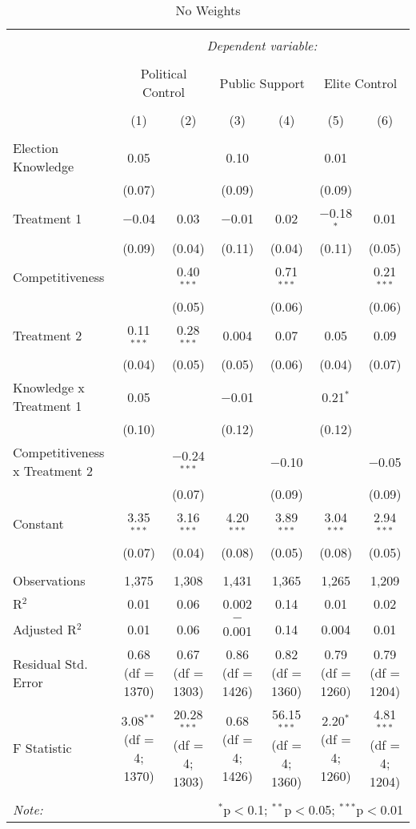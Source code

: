 
\begin{table}[!htbp] \centering 
  \caption{No Weights} 
  \label{} 
\small 
\begin{tabular}{@{\extracolsep{3pt}}lcccccc} 
\\[-1.8ex]\hline 
\hline \\[-1.8ex] 
 & \multicolumn{6}{c}{\textit{Dependent variable:}} \\ 
\cline{2-7} 
\\[-1.8ex] & \multicolumn{2}{c}{Political Control} & \multicolumn{2}{c}{Public Support} & \multicolumn{2}{c}{Elite Control} \\ 
\\[-1.8ex] & (1) & (2) & (3) & (4) & (5) & (6)\\ 
\hline \\[-1.8ex] 
 Election Knowledge & 0.05 &  & 0.10 &  & 0.01 &  \\ 
  & (0.07) &  & (0.09) &  & (0.09) &  \\ 
  Treatment 1 & $-$0.04 & 0.03 & $-$0.01 & 0.02 & $-$0.18$^{*}$ & 0.01 \\ 
  & (0.09) & (0.04) & (0.11) & (0.04) & (0.11) & (0.05) \\ 
  Competitiveness &  & 0.40$^{***}$ &  & 0.71$^{***}$ &  & 0.21$^{***}$ \\ 
  &  & (0.05) &  & (0.06) &  & (0.06) \\ 
  Treatment 2 & 0.11$^{***}$ & 0.28$^{***}$ & 0.004 & 0.07 & 0.05 & 0.09 \\ 
  & (0.04) & (0.05) & (0.05) & (0.06) & (0.04) & (0.07) \\ 
  Knowledge x Treatment 1 & 0.05 &  & $-$0.01 &  & 0.21$^{*}$ &  \\ 
  & (0.10) &  & (0.12) &  & (0.12) &  \\ 
  Competitiveness x Treatment 2 &  & $-$0.24$^{***}$ &  & $-$0.10 &  & $-$0.05 \\ 
  &  & (0.07) &  & (0.09) &  & (0.09) \\ 
  Constant & 3.35$^{***}$ & 3.16$^{***}$ & 4.20$^{***}$ & 3.89$^{***}$ & 3.04$^{***}$ & 2.94$^{***}$ \\ 
  & (0.07) & (0.04) & (0.08) & (0.05) & (0.08) & (0.05) \\ 
 \hline \\[-1.8ex] 
Observations & 1,375 & 1,308 & 1,431 & 1,365 & 1,265 & 1,209 \\ 
R$^{2}$ & 0.01 & 0.06 & 0.002 & 0.14 & 0.01 & 0.02 \\ 
Adjusted R$^{2}$ & 0.01 & 0.06 & $-$0.001 & 0.14 & 0.004 & 0.01 \\ 
Residual Std. Error & 0.68 (df = 1370) & 0.67 (df = 1303) & 0.86 (df = 1426) & 0.82 (df = 1360) & 0.79 (df = 1260) & 0.79 (df = 1204) \\ 
F Statistic & 3.08$^{**}$ (df = 4; 1370) & 20.28$^{***}$ (df = 4; 1303) & 0.68 (df = 4; 1426) & 56.15$^{***}$ (df = 4; 1360) & 2.20$^{*}$ (df = 4; 1260) & 4.81$^{***}$ (df = 4; 1204) \\ 
\hline 
\hline \\[-1.8ex] 
\textit{Note:}  & \multicolumn{6}{r}{$^{*}$p$<$0.1; $^{**}$p$<$0.05; $^{***}$p$<$0.01} \\ 
\end{tabular} 
\end{table} 
